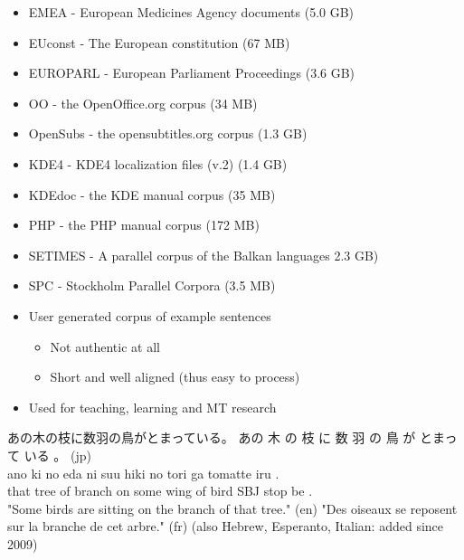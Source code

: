 \documentclass[a4paper,landscape,headrule,footrule,xetex]{foils}
\begin{document}
\begin{itemize} \addtolength{\itemsep}{-1ex}
\item EMEA - European Medicines Agency documents (5.0 GB)
\item EUconst - The European constitution (67 MB)
\item EUROPARL - European Parliament Proceedings (3.6 GB)
\item OO - the OpenOffice.org corpus (34 MB)
\item OpenSubs - the opensubtitles.org corpus (1.3 GB)
\item KDE4 - KDE4 localization files (v.2) (1.4 GB)
\item KDEdoc - the KDE manual corpus (35 MB)
\item PHP - the PHP manual corpus (172 MB)
\item SETIMES - A parallel corpus of the Balkan languages 2.3 GB)
\item SPC - Stockholm Parallel Corpora (3.5 MB)
\end{itemize}



\begin{itemize}
\item User generated corpus of example sentences
  \begin{itemize}
  \item Not authentic at all
  \item Short and well aligned (thus easy to process)
  \end{itemize}
\item Used for teaching, learning and MT research 
\end{itemize}

\begin{exe} \small
\ex \label{7836}
あの木の枝に数羽の鳥がとまっている。
\glll あの 木 の 枝 に 数 羽 の 鳥 が とまって いる 。 (jp)\\
 ano ki no eda ni suu hiki no tori ga tomatte iru . \\
 that tree of branch on some wing of bird SBJ stop be . \\
\trans "Some birds are sitting on the branch of that tree." (en)
\trans "Des oiseaux se reposent sur la branche de cet arbre." (fr)
\trans (also Hebrew, Esperanto, Italian: added since 2009)
\end{exe}
\end{document}
